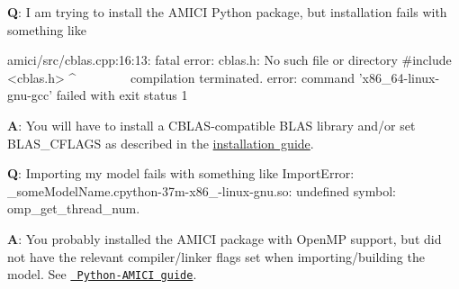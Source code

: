 

{\bfseries{Q}}\+: I am trying to install the A\+M\+I\+CI Python package, but installation fails with something like \begin{DoxyVerb}amici/src/cblas.cpp:16:13: fatal error: cblas.h: No such file or directory
#include <cblas.h>
         ^~~~~~~~~
compilation terminated.
error: command 'x86_64-linux-gnu-gcc' failed with exit status 1
\end{DoxyVerb}


{\bfseries{A}}\+: You will have to install a C\+B\+L\+A\+S-\/compatible B\+L\+AS library and/or set {\ttfamily B\+L\+A\+S\+\_\+\+C\+F\+L\+A\+GS} as described in the \mbox{\hyperlink{md__i_n_s_t_a_l_l}{installation guide}}.



{\bfseries{Q}}\+: Importing my model fails with something like {\ttfamily Import\+Error\+: \+\_\+some\+Model\+Name.\+cpython-\/37m-\/x86\+\_-\/linux-\/gnu.\+so\+: undefined symbol\+: omp\+\_\+get\+\_\+thread\+\_\+num}.

{\bfseries{A}}\+: You probably installed the A\+M\+I\+CI package with Open\+MP support, but did not have the relevant compiler/linker flags set when importing/building the model. See \href{PYTHON.md\#model-compilation}{\texttt{ Python-\/\+A\+M\+I\+CI guide}}. 